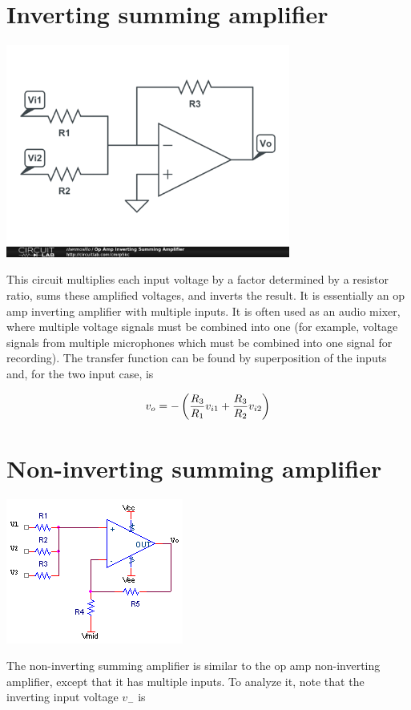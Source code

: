 \section{Inverting summing amplifier}
\begin{center}
	\includegraphics[width=0.70\textwidth]{schematics/invsummingamp.PNG}
\end{center}

This circuit multiplies each input voltage by a factor determined by a resistor ratio, sums these amplified voltages, and inverts the result.
It is essentially an op amp inverting amplifier with multiple inputs.
It is often used as an audio mixer, where multiple voltage signals must be combined into one (for example, voltage signals from multiple microphones which must be combined into one signal for recording).
The transfer function can be found by superposition of the inputs and, for the two input case, is

\textcolor{red}{
\begin{equation}
v_o = -\left(\frac{R_3}{R_1}v_{i1} + \frac{R_3}{R_2}v_{i2}\right)
\label{eq:invertingsummingamplifier}
\end{equation}
}


\section{Non-inverting summing amplifier}
\begin{center}
	\includegraphics{schematics/summingamp.PNG}
\end{center}
The non-inverting summing amplifier is similar to the op amp non-inverting amplifier, except that it has multiple inputs. To analyze it, note that the inverting input voltage $v_{-}$ is

